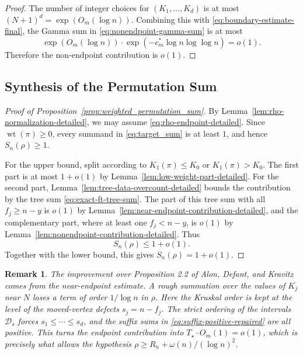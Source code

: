 \documentclass[10pt,a4paper]{amsart}
\newtheorem{remark}[theorem]{Remark}
\renewcommand\le{\leqslant}
\renewcommand\ge{\geqslant}
\newcommand{\wt}{\operatorname{wt}}
\begin{document}
\begin{proof}
The number of integer choices for $(K_1,\ldots,K_d)$ is at most $(N+1)^d=\exp(O_m(\log n))$. Combining this with \eqref{eq:boundary-estimate-final}, the Gamma sum in \eqref{eq:nonendpoint-gamma-sum} is at most
\[
\exp(O_m(\log n))\cdot \exp(-c_m^\ast\log n\log\log n)=o(1).
\]
Therefore the non-endpoint contribution is $o(1)$.
\end{proof}


\subsection{Synthesis of the Permutation Sum}\label{subsec:synthesis}

\begin{proof}[Proof of Proposition~\ref{prop:weighted_permutation_sum}]
By Lemma~\ref{lem:rho-normalization-detailed}, we may assume \eqref{eq:rho-endpoint-detailed}. Since $\wt(\pi)\ge0$, every summand in \eqref{eq:target_sum} is at least $1$, and hence $S_n(\rho)\ge1$.

For the upper bound, split according to $K_1(\pi)\le K_0$ or $K_1(\pi)>K_0$. The first part is at most $1+o(1)$ by Lemma~\ref{lem:low-weight-part-detailed}. For the second part, Lemma~\ref{lem:tree-data-overcount-detailed} bounds the contribution by the tree sum \eqref{eq:exact-ft-tree-sum}. The part of this tree sum with all $f_j\ge n-y$ is $o(1)$ by Lemma~\ref{lem:near-endpoint-contribution-detailed}, and the complementary part, where at least one $f_j<n-y$, is $o(1)$ by Lemma~\ref{lem:nonendpoint-contribution-detailed}. Thus
\[
        S_n(\rho)\le 1+o(1).
\]
Together with the lower bound, this gives $S_n(\rho)=1+o(1)$.
\end{proof}


\begin{remark}\label{remark:final}
The improvement over Proposition 2.2 of Alon, Defant, and Kravitz~\cite{ADK} comes from the near-endpoint estimate. A rough summation over the values of \(K_j\) near \(N\) loses a term of order \(1/\log n\) in \(\rho\). Here the Kruskal order is kept at the level of the moved-vertex defects \(s_j=n-f_j\). The strict ordering of the intervals \(\mathcal D_s\) forces \(s_1\le\cdots\le s_d\), and the suffix sums in \eqref{eq:suffix-positive-repaired} are all positive. This turns the endpoint contribution into \(T_\star\cdot O_m(1)=o(1)\), which is precisely what allows the hypothesis \(\rho\ge R_n+\omega(n)/(\log n)^2\).
\end{remark}

\medskip
\end{document}
